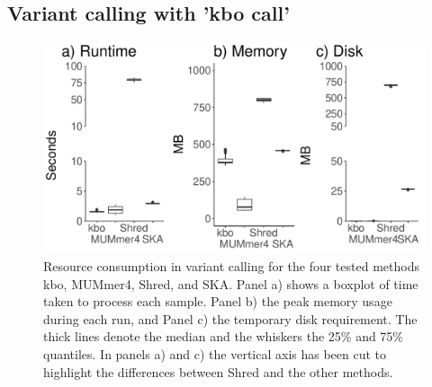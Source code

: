 \documentclass[unnumsec,webpdf,contemporary,large]{oup-authoring-template}%
\theoremstyle{thmstyleone}%
\theoremstyle{thmstyletwo}%
\theoremstyle{thmstylethree}%
\newcommand{\kbo}{{\sf kbo}}
\begin{document}
\subsection{Variant calling with 'kbo call'}
\begin{figure}
    \centering
    \includegraphics[width=1.0\linewidth]{fig/variant_calling_resource_consumption.pdf}
    \caption{Resource consumption in variant calling for the four tested methods \kbo, MUMmer4, Shred, and SKA. Panel a) shows a boxplot of time taken to process each sample. Panel b) the peak memory usage during each run, and Panel c) the temporary disk requirement. The thick lines denote the median and the whiskers the 25\% and 75\% quantiles. In panels a) and c) the vertical axis has been cut to highlight the differences between Shred and the other methods. }
    \label{fig:vc-resource-usage}
\end{figure}
\end{document}

